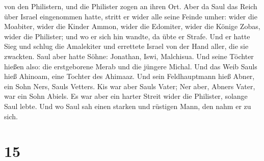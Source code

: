 von den Philistern, und die Philister zogen an ihren Ort. 
Aber da Saul das Reich über Israel eingenommen hatte, stritt er wider
alle seine Feinde umher: wider die Moabiter, wider die Kinder Ammon,
wider die Edomiter, wider die Könige Zobas, wider die Philister; und wo
er sich hin wandte, da übte er Strafe.  Und er hatte Sieg
und schlug die Amalekiter und errettete Israel von der Hand aller, die
sie zwackten.  Saul aber hatte Söhne: Jonathan, Iswi,
Malchisua. Und seine Töchter hießen also: die erstgeborene Merab und die
jüngere Michal.  Und das Weib Sauls hieß Ahinoam, eine
Tochter des Ahimaaz. Und sein Feldhauptmann hieß Abner, ein Sohn Ners,
Sauls Vetters.  Kis war aber Sauls Vater; Ner aber, Abners
Vater, war ein Sohn Abiels.  Es war aber ein harter Streit
wider die Philister, solange Saul lebte. Und wo Saul sah einen starken
und rüstigen Mann, den nahm er zu sich.

\hypertarget{section-14}{%
\section{15}\label{section-14}}

